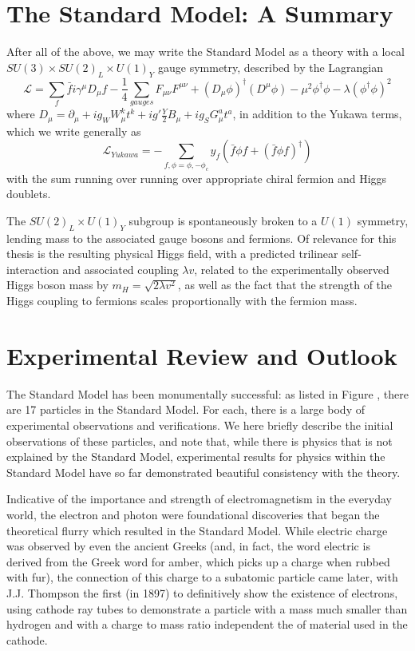 \section{The Standard Model: A Summary}
After all of the above, we may write the Standard Model as a theory with a local $SU(3) \times SU(2)_{L} \times U(1)_{Y}$
gauge symmetry, described by the Lagrangian
\begin{equation}
\mathcal{L} = \sum\limits_{f} \bar{f}i\gamma^{\mu}D_{\mu}f -\frac{1}{4} \sum\limits_{gauges} F_{\mu\nu}F^{\mu\nu} +
 (D_{\mu}\phi)^{\dagger}(D^{\mu}\phi)-\mu^2\phi^{\dagger}\phi - \lambda(\phi^{\dagger}\phi)^2
\end{equation}
where $D_{\mu} = \partial_{\mu} + ig_{W}W_{\mu}^{k}t^{k} + ig'\frac{Y}{2}B_{\mu}+ig_{S}G_{\mu}^{a}t^{a}$, in 
addition to the Yukawa terms, which we write generally as 
\begin{equation}
\mathcal{L}_{Yukawa} = -\sum\limits_{f, \phi=\phi, -\phi_c} y_{f}(\bar{f}\phi f + (\bar{f}\phi f)^{\dagger})
\end{equation}
with the sum running over running over appropriate chiral fermion and Higgs doublets. 

The $SU(2)_{L} \times U(1)_{Y}$ subgroup is spontaneously broken to a $U(1)$ symmetry, lending mass to the
associated gauge bosons and fermions. Of relevance for this thesis is the resulting physical 
Higgs field, with a predicted trilinear self-interaction and associated coupling $\lambda v$, related 
to the experimentally observed Higgs boson mass by $m_{H} = \sqrt{2\lambda v^2}$, as well as the 
fact that the strength of the Higgs coupling to fermions scales proportionally with the fermion mass.

\section{Experimental Review and Outlook}
The Standard Model has been monumentally successful: as listed in Figure \cite{SM-figure}, there are 
17 particles in the Standard Model. For each, there is a large body of experimental observations 
and verifications. We here briefly describe the initial observations of these particles, and note that, 
while there is physics that is not explained by the Standard Model, experimental results for physics within 
the Standard Model have so far demonstrated beautiful consistency with the theory.

Indicative of the importance and strength of electromagnetism in the everyday world, the electron and 
photon were foundational discoveries that began the theoretical flurry which resulted in the Standard Model. 
While electric charge was observed by even the ancient Greeks (and, in fact, the word electric is derived from 
the Greek word for amber, which picks up a charge when rubbed with fur), the connection of this charge 
to a subatomic particle came later, with J.J. Thompson the first (in 1897) to definitively show the existence of 
electrons, using cathode ray tubes to demonstrate a particle with a mass much smaller than hydrogen and 
with a charge to mass ratio independent the of material used in the cathode.

